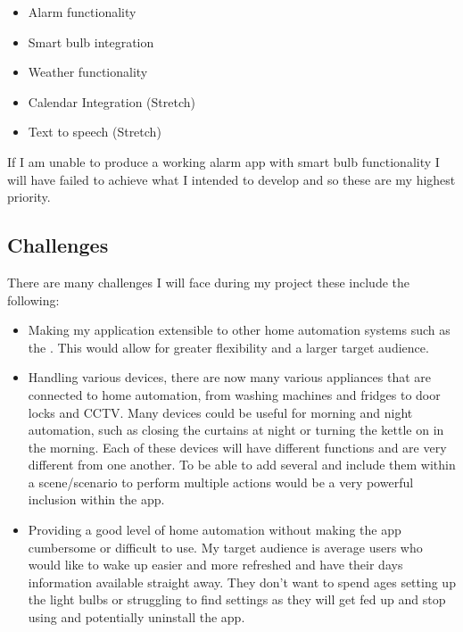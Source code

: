 \begin{itemize}
\tightlist
\item
  Alarm functionality
\item
  Smart bulb integration
\item
  Weather functionality
\item
  Calendar Integration (Stretch)
\item
  Text to speech (Stretch)
\end{itemize}

If I am unable to produce a working alarm app with smart bulb
functionality I will have failed to achieve what I intended to develop
and so these are my highest priority.

\subsection{Challenges}\label{challenges}

There are many challenges I will face during my project these include
the following:

\begin{itemize}
\item
  Making my application extensible to other home automation systems such
  as the \cite{belkinwemo}. This would allow for greater flexibility and
  a larger target audience.
\item
  Handling various devices, there are now many various appliances that
  are connected to home automation, from washing machines and fridges to
  door locks and CCTV. Many devices could be useful for morning and
  night automation, such as closing the curtains at night or turning the
  kettle on in the morning. Each of these devices will have different
  functions and are very different from one another. To be able to add
  several and include them within a scene/scenario to perform multiple
  actions would be a very powerful inclusion within the app.
\item
  Providing a good level of home automation without making the app
  cumbersome or difficult to use. My target audience is average users
  who would like to wake up easier and more refreshed and have their
  days information available straight away. They don't want to spend
  ages setting up the light bulbs or struggling to find settings as they
  will get fed up and stop using and potentially uninstall the app.
\end{itemize}
